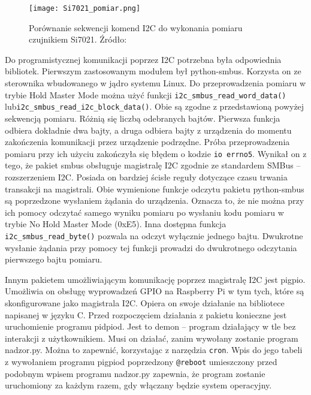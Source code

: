 \documentclass[a4paper,12pt,twoside]{article}
\begin{document}
\begin{figure}[H]
\begin{center}
\texttt{[image: Si7021\_pomiar.png]}
\caption{Porównanie sekwencji komend I2C do wykonania pomiaru czujnikiem Si7021. Źródło: \cite{czujnik_temp}}
\label{fig: metody_pomiaru}
\end{center}
\end{figure}

Do programistycznej komunikacji poprzez I2C potrzebna była odpowiednia bibliotek. Pierwszym zastosowanym modułem był python-smbus. Korzysta on ze sterownika wbudowanego w jądro systemu Linux. Do przeprowadzenia pomiaru w trybie Hold Master Mode można użyć funkcji \texttt{i2c{\_}smbus{\_}read{\_}word{\_}data()} \linebreak lub\texttt{i2c{\_}smbus{\_}read{\_}i2c{\_}block{\_}data()}. Obie są zgodne z przedstawioną powyżej sekwencją pomiaru. Różnią się liczbą odebranych bajtów. Pierwsza funkcja odbiera dokładnie dwa bajty, a druga odbiera bajty z urządzenia do momentu zakończenia komunikacji przez urządzenie podrzędne\cite{smbus}. Próba przeprowadzenia pomiaru przy ich użyciu zakończyła się błędem o kodzie \texttt{io errno5}. Wynikał on z tego, że pakiet smbus obsługuje magistralę I2C zgodnie ze standardem SMBus -- rozszerzeniem I2C. Posiada on bardziej ścisłe reguły dotyczące czasu trwania transakcji na magistrali. Obie wymienione funkcje odczytu pakietu python-smbus są poprzedzone wysłaniem żądania do urządzenia. Oznacza to, że nie można przy ich pomocy odczytać samego wyniku pomiaru po wysłaniu kodu pomiaru w trybie No Hold Master Mode (0xE5). Inna dostępna funkcja \texttt{i2c{\_}smbus{\_}read{\_}byte()} pozwala na odczyt wyłącznie jednego bajtu. Dwukrotne wysłanie żądania przy pomocy tej funkcji prowadzi do dwukrotnego odczytania pierwszego bajtu pomiaru. 

Innym pakietem umożliwiającym komunikację poprzez magistralę I2C jest pigpio. Umożliwia on obsługę wyprowadzeń GPIO na Raspberry Pi w tym tych, które są skonfigurowane jako magistrala I2C. Opiera on swoje działanie na bibliotece napisanej w języku C. Przed rozpoczęciem działania z pakietu konieczne jest uruchomienie programu pidpiod. Jest to demon -- program działający w tle bez interakcji z użytkownikiem. Musi on działać, zanim wywołany zostanie program nadzor.py. Można to zapewnić, korzystając z narzędzia \texttt{cron}. Wpis do jego tabeli z wywołaniem programu pigpiod poprzedzony \texttt{@reboot} umieszczony przed podobnym wpisem programu nadzor.py zapewnia, że program zostanie uruchomiony za każdym razem, gdy włączany będzie system operacyjny.
\end{document}
